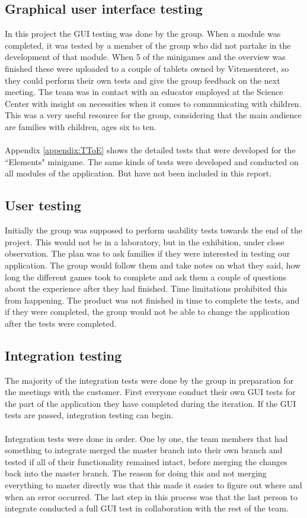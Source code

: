 \subsection{Graphical user interface testing}
In this project the GUI testing was done by the group. When a module was completed, it was tested by a member of the group who did not partake in the development of that module. When 5 of the minigames and the overview was finished these were uploaded to a couple of tablets owned by Vitensenteret, so they could perform their own tests and give the group feedback on the next meeting. The team was in contact with an educator employed at the Science Center with insight on necessities when it comes to communicating with children. This was a very useful resource for the group, considering that the main audience are families with children, ages six to ten.\\
\\
Appendix \ref{appendix:TToE} shows the detailed tests that were developed for the ``Elements" minigame. The same kinds of tests were developed and conducted on all modules of the application. But have not been included in this report.

\subsection{User testing}
Initially the group was supposed to perform usability tests towards the end of the project. This would not be in a laboratory, but in the exhibition, under close observation. The plan was to ask families if they were interested in testing our application. The group would follow them and take notes on what they said, how long the different games took to complete and ask them a couple of questions about the experience after they had finished. Time limitations prohibited this from happening. The product was not finished in time to complete the tests, and if they were completed, the group would not be able to change the application after the tests were completed.

\subsection{Integration testing}
The majority of the integration tests were done by the group in preparation for the meetings with the customer. First everyone conduct their own GUI tests for the part of the application they have completed during the iteration. If the GUI tests are passed, integration testing can begin.
\\\\
Integration tests were done in order. One by one, the team members that had something to integrate merged the master branch into their own branch and tested if all of their functionality remained intact, before merging the changes back into the master branch. The reason for doing this and not merging everything to master directly was that this made it easier to figure out where and when an error occurred. The last step in this process was that the last person to integrate conducted a full GUI test in collaboration with the rest of the team.

